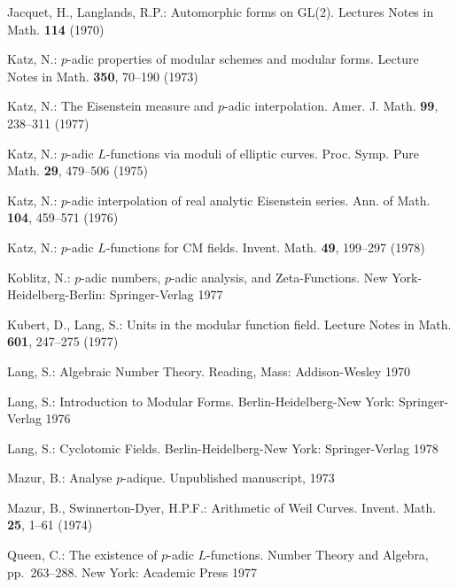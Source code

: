\documentclass[12pt,a4paper]{article}
\theoremstyle{plain}
\theoremstyle{definition}
\theoremstyle{remark}
\begin{document}
\begin{enumerate}[label={[\arabic*]}, leftmargin=*, itemsep=0.5ex]
\item Jacquet, H., Langlands, R.P.: Automorphic forms on GL(2). Lectures Notes in Math. \textbf{114} (1970)

\item Katz, N.: $p$-adic properties of modular schemes and modular forms. Lecture Notes in Math. \textbf{350}, 70--190 (1973)

\item Katz, N.: The Eisenstein measure and $p$-adic interpolation. Amer. J. Math. \textbf{99}, 238--311 (1977)

\item Katz, N.: $p$-adic $L$-functions via moduli of elliptic curves. Proc. Symp. Pure Math. \textbf{29}, 479--506 (1975)

\item Katz, N.: $p$-adic interpolation of real analytic Eisenstein series. Ann. of Math. \textbf{104}, 459--571 (1976)

\item Katz, N.: $p$-adic $L$-functions for CM fields. Invent. Math. \textbf{49}, 199--297 (1978)

\item Koblitz, N.: $p$-adic numbers, $p$-adic analysis, and Zeta-Functions. New York-Heidelberg-Berlin: Springer-Verlag 1977

\item Kubert, D., Lang, S.: Units in the modular function field. Lecture Notes in Math. \textbf{601}, 247--275 (1977)

\item Lang, S.: Algebraic Number Theory. Reading, Mass: Addison-Wesley 1970

\item Lang, S.: Introduction to Modular Forms. Berlin-Heidelberg-New York: Springer-Verlag 1976

\item Lang, S.: Cyclotomic Fields. Berlin-Heidelberg-New York: Springer-Verlag 1978

\item Mazur, B.: Analyse $p$-adique. Unpublished manuscript, 1973

\item Mazur, B., Swinnerton-Dyer, H.P.F.: Arithmetic of Weil Curves. Invent. Math. \textbf{25}, 1--61 (1974)

\item Queen, C.: The existence of $p$-adic $L$-functions. Number Theory and Algebra, pp.~263--288. New York: Academic Press 1977


\end{enumerate}
\end{document}
